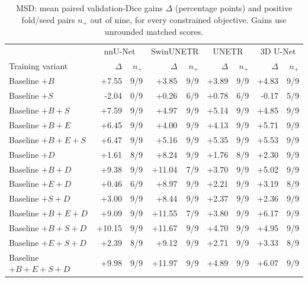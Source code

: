 \documentclass[12pt,a4paper]{article}
\begin{document}
\begin{table}[htbp]
\centering\small{}
\setlength{\tabcolsep}{4pt}
\renewcommand{\arraystretch}{1.12}
\begin{tabular}{@{}l*{4}{rr}@{}}
\hline
 & \multicolumn{2}{c}{nnU-Net} & \multicolumn{2}{c}{SwinUNETR} & \multicolumn{2}{c}{UNETR} & \multicolumn{2}{c}{3D U-Net} \\
Training variant & $\Delta$ & $n_+$ & $\Delta$ & $n_+$ & $\Delta$ & $n_+$ & $\Delta$ & $n_+$ \\
\hline
Baseline $+B$ & +7.55 & 9/9 & +3.85 & 9/9 & +3.89 & 9/9 & +4.83 & 9/9 \\
Baseline $+S$ & -2.04 & 0/9 & +0.26 & 6/9 & +0.78 & 6/9 & -0.17 & 5/9 \\
Baseline $+B+S$ & +7.59 & 9/9 & +4.97 & 9/9 & +5.14 & 9/9 & +4.85 & 9/9 \\
Baseline $+B+E$ & +6.45 & 9/9 & +4.00 & 9/9 & +4.13 & 9/9 & +5.71 & 9/9 \\
Baseline $+B+E+S$ & +6.47 & 9/9 & +5.16 & 9/9 & +5.35 & 9/9 & +5.53 & 9/9 \\
Baseline $+D$ & +1.61 & 8/9 & +8.24 & 9/9 & +1.76 & 8/9 & +2.30 & 9/9 \\
Baseline $+B+D$ & +9.38 & 9/9 & +11.04 & 7/9 & +3.70 & 9/9 & +5.02 & 9/9 \\
Baseline $+E+D$ & +0.46 & 6/9 & +8.97 & 9/9 & +2.21 & 9/9 & +3.19 & 8/9 \\
Baseline $+S+D$ & +3.00 & 9/9 & +8.44 & 9/9 & +2.37 & 9/9 & +2.36 & 9/9 \\
Baseline $+B+E+D$ & +9.09 & 9/9 & +11.55 & 7/9 & +3.80 & 9/9 & +6.17 & 9/9 \\
Baseline $+B+S+D$ & +10.15 & 9/9 & +11.67 & 9/9 & +4.70 & 9/9 & +4.95 & 9/9 \\
Baseline $+E+S+D$ & +2.39 & 8/9 & +9.12 & 9/9 & +2.71 & 9/9 & +3.33 & 8/9 \\
Baseline $+B+E+S+D$ & +9.98 & 9/9 & +11.97 & 9/9 & +4.89 & 9/9 & +6.07 & 9/9 \\
\hline
\end{tabular}
\caption{MSD: mean paired validation-Dice gains $\Delta$
(percentage points) and positive fold/seed pairs $n_+$ out of nine,
for every constrained objective. Gains use unrounded matched scores.}
\label{tab:msd-noaug-ledger}
\end{table}
\end{document}
